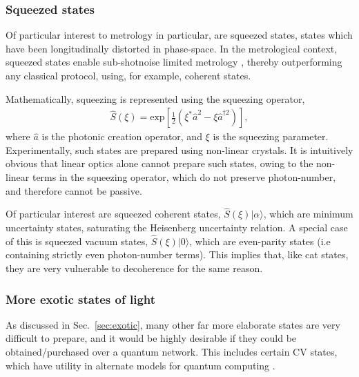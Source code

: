 \documentclass[aps, rmp, twocolumn, amsmath, amssymb, nofootinbib, superscriptaddress, longbibliography, floatfix, table-of-contents, eqsecnum]{revtex4-1}
\newcommand{\ket}[1]{|#1\rangle}
\newcommand{\comment}[1]{{\color{blue}{\textbf{#1}}}}
\begin{document}
%
%

\subsubsection{Squeezed states} \label{sec:squeezed} 

Of particular interest to metrology in particular, are squeezed states, states which have been longitudinally distorted in phase-space. In the metrological context, squeezed states enable sub-shotnoise limited metrology \cite{???}, thereby outperforming any classical protocol, using, for example, coherent states.

Mathematically, squeezing is represented using the squeezing operator,
\begin{align}
\hat{S}(\xi) = \text{exp}\left[ \frac{1}{2}(\xi^*\hat{a}^2 - \xi{\hat{a}^{\dag 2}})\right],
\end{align}
where $\hat{a}$ is the photonic creation operator, and $\xi$ is the squeezing parameter. Experimentally, such states are prepared using non-linear crystals. It is intuitively obvious that linear optics alone cannot prepare such states, owing to the non-linear terms in the squeezing operator, which do not preserve photon-number, and therefore cannot be passive.

Of particular interest are squeezed coherent states, $\hat{S}(\xi) \ket{\alpha}$, which are minimum uncertainty states, saturating the Heisenberg uncertainty relation. A special case of this is squeezed vacuum states, $\hat{S}(\xi) \ket{0}$, which are even-parity states (i.e containing strictly even photon-number terms). This implies that, like cat states, they are very vulnerable to decoherence for the same reason.

%
%

\subsubsection{More exotic states of light}

As discussed in Sec.~\ref{sec:exotic}, many other far more elaborate states are very difficult to prepare, and it would be highly desirable if they could be obtained/purchased over a quantum network. This includes certain CV states, which have utility in alternate models for quantum computing \cite{bib:Menicucci06, Ralph, Lund}.

\comment{To do!}
\end{document}
